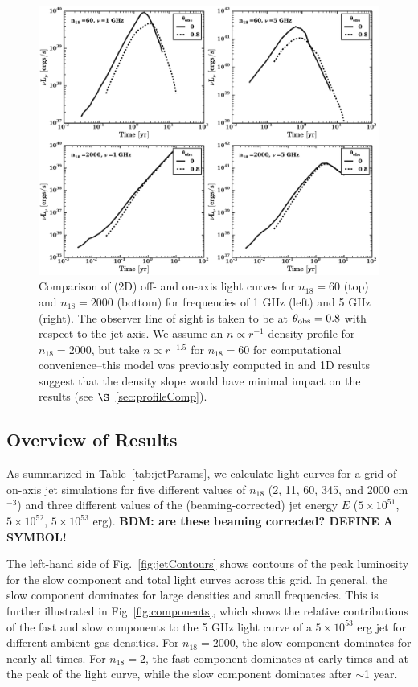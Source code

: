 \documentclass[usenatbib,fleqn]{mnras}
\begin{document}
\begin{figure}
\includegraphics[width=16cm]{on_off.pdf}
\caption{\label{fig:onOff} Comparison of (2D) off- and on-axis light
  curves for $n_{18}=60$ (top) and $n_{18}=2000$ (bottom) for
  frequencies of 1 GHz (left) and 5 GHz (right). The observer line of
  sight is taken to be at $\theta_{\rm obs}=0.8$ with respect to the
  jet axis. We assume an $n\propto r^{-1}$ density profile for
  $n_{18}=2000$, but take $n\propto r^{-1.5}$ for $n_{18}=60$ for
  computational convenience--this model was previously computed in
  \citet{Mimica+2015} and 1D results suggest that the density slope
  would have minimal impact on the results (see
  $\S$~\ref{sec:profileComp}).}
\end{figure}

\subsection{Overview of Results}
As summarized in Table~\ref{tab:jetParams}, we calculate light curves
for a grid of on-axis jet simulations for five different values of
$n_{18}$ (2, 11, 60, 345, and 2000 cm$^{-3}$) and three different
values of the (beaming-corrected) jet energy $E$ ($5\times 10^{51}$,
$5\times 10^{52}$, $5\times 10^{53}$ erg). {\bf BDM: are these beaming
  corrected?  DEFINE A SYMBOL!}

The left-hand side of Fig.~\ref{fig:jetContours} shows contours of the
peak luminosity for the slow component and total light curves across
this grid. In general, the slow component dominates for large
densities and small frequencies.  This is further illustrated in
Fig~\ref{fig:components}, which shows the relative contributions of
the fast and slow components to the 5 GHz light curve of a $5 \times
10^{53}$ erg jet for different ambient gas densities. For
$n_{18}=2000$, the slow component dominates for nearly all times.  For
$n_{18}=2$, the fast component dominates at early times and at the
peak of the light curve, while the slow component dominates after
$\sim$1 year.
\end{document}
